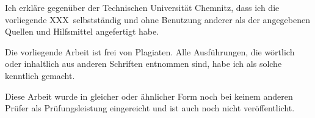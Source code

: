 %
%

\begin{tucerklaerung}
Ich erkläre gegenüber der Technischen Universität Chemnitz, dass ich die
vorliegende XXX\ selbstständig und ohne Benutzung anderer
als der angegebenen Quellen und Hilfsmittel angefertigt habe.

Die vorliegende Arbeit ist frei von Plagiaten. Alle Ausführungen, die wörtlich
oder inhaltlich aus anderen Schriften entnommen sind, habe ich als solche
kenntlich gemacht.

Diese Arbeit wurde in gleicher oder ähnlicher Form noch bei keinem anderen
Prüfer als Prüfungsleistung eingereicht und ist auch noch nicht veröffentlicht.

\end{tucerklaerung}



%
%

%
%
%
